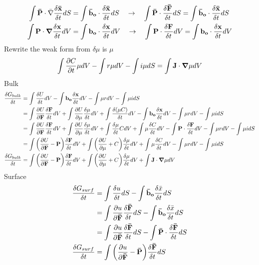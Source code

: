 \documentclass[12pt,3p]{article}
\numberwithin{equation}{section}
\begin{document}
\begin{align*}
\int \mathbf{\bar{P}} \cdot \bar{\nabla} \frac{\delta \mathbf{\bar{x}}}{\delta t} dS  &= \int \mathbf{\bar{b}_o} \cdot \frac{\delta \mathbf{\bar{x}}}{\delta t} dS 
\quad \rightarrow \quad 
\int \mathbf{\bar{P}} \cdot \frac{\delta \mathbf{\bar{F}}}{\delta t} dS = \int \mathbf{\bar{b}_o} \cdot \frac{\delta \mathbf{\bar{x}}}{\delta t} dS \\
\int \mathbf{P} \cdot \grad \frac{\delta \mathbf{x}}{\delta t} dV &= \int \mathbf{b_o} \cdot \frac{\delta \mathbf{x}}{\delta t} dV 
\quad \rightarrow \quad 
\int \mathbf{P} \cdot \frac{\delta \mathbf{F}}{\delta t} dV = \int \mathbf{b_o} \cdot \frac{\delta \mathbf{x}}{\delta t} dV
\end{align*}
Rewrite the weak form from $\delta \mu$ is $\mu$
\begin{align*}
\int \pdv{C}{t}  \mu dV - \int r \mu dV - \int i \mu dS = \int \mathbf{J} \cdot \grad \mu dV
\end{align*}
Bulk 
\begin{align*}
 \frac{\delta G_{bulk}}{\delta t} &= \int \frac{\delta U}{\delta t} dV  - \int \mathbf{b_o} \frac{\delta \mathbf{x}}{\delta t} dV - \int \mu r dV - \int \mu i dS \\
 	&= \int \pdv{U}{\mathbf{F}} \frac{\delta \mathbf{F}}{\delta t} dV + \int \pdv{U}{\mu} \frac{\delta \mu}{\delta t} dV + \int \frac{\delta (\mu C)}{\delta t} dV - \int \mathbf{b_o} \frac{\delta \mathbf{x}}{\delta t} dV - \int \mu r dV - \int \mu i dS \\
	 &= \int \pdv{U}{\mathbf{F}} \frac{\delta \mathbf{F}}{\delta t} dV + \int \pdv{U}{\mu} \frac{\delta \mu}{\delta t} dV + \int \frac{\delta \mu}{\delta t} C dV + \int \mu \frac{\delta C}{\delta t} dV- \int \mathbf{P} \cdot \frac{\delta \mathbf{F}}{\delta t} dV - \int \mu r dV - \int \mu i dS \\
	 &= \int \bigg( \pdv{U}{\mathbf{F}} - \mathbf{P} \bigg) \frac{\delta \mathbf{F}}{\delta t} dV + \int \bigg( \pdv{U}{\mu} + C \bigg) \frac{\delta \mu}{\delta t} dV + \int \mu \frac{\delta C}{\delta t} dV - \int \mu r dV - \int \mu i dS \\
 \frac{\delta G_{bulk}}{\delta t} &= \int \bigg( \pdv{U}{\mathbf{F}} - \mathbf{P} \bigg) \frac{\delta \mathbf{F}}{\delta t} dV + \int \bigg( \pdv{U}{\mu} + C \bigg) \frac{\delta \mu}{\delta t} dV + \int \mathbf{J} \cdot \grad \mu dV
\end{align*}
Surface
\begin{align*}
\frac{\delta G_{surf}}{\delta t} &= \int \frac{\delta u}{\delta t} dS - \int \mathbf{\bar{b}_o} \frac{\delta \bar{x}}{\delta t} dS \\
	&= \int \pdv{u}{\mathbf{\bar{F}}} \frac{\delta \mathbf{\bar{F}}}{\delta t} dS - \int \mathbf{\bar{b}_o} \frac{\delta \bar{x}}{\delta t} dS \\
	&= \int \pdv{u}{\mathbf{\bar{F}}} \frac{\delta \mathbf{\bar{F}}}{\delta t} dS - \int \mathbf{\bar{P}} \cdot \frac{\delta \mathbf{\bar{F}}}{\delta t} dS \\
\frac{\delta G_{surf}}{\delta t} &= \int \bigg( \pdv{u}{\mathbf{\bar{F}}} - \mathbf{\bar{P}} \bigg)  \frac{\delta \mathbf{\bar{F}}}{\delta t} dS 
\end{align*}
\end{document}
